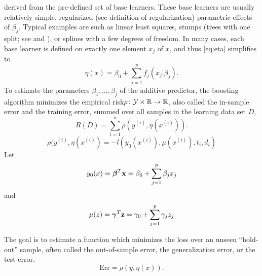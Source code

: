 derived from the pre-defined set of base learners.
These base learners are usually relatively simple, regularized (see definition of regularization) parametric effects of $\beta_j$. Typical examples are such as linear least squares, stumps (trees with one split; see \citet{buhlmann2007} and \citet{ESL}), or splines with a few degrees of freedom. In many cases, each base learner is defined on exactly one element $x_j$ of $x$, and thus \eqref{eq:eta} simplifies to
\begin{equation}\label{eq:eta-componentwise}
    \eta(x)=\beta_0+\sum_{j=1}^pf_j(x_j|\beta_j).
\end{equation}
To estimate the parameters $\beta_1,\ldots,\beta_j$ of the additive predictor, the boosting algorithm minimizes the empirical risk$\rho\colon\mathcal{Y}\times\mathbb{R}\to\mathbb{R}$, also called the in-sample error and the training error, summed over all samples in the learning data set $D$,
\begin{equation}\label{eq:empirical-risk}
    R(D)=\sum_{i=1}^n\rho(y^{(i)},\eta(x^{(i)})).
\end{equation}
\begin{equation}
    \rho(y^{(i)},\eta(x^{(i)})=-l(y_0(x^{(i)}), \mu(x^{(i)}), t_i, d_i)
\end{equation}
Let
\begin{equation}
    y_0(x)=\boldsymbol{\beta}^T\mathbf{x}=\beta_0+\sum_{j=1}^p \beta_jx_j
\end{equation}
and
\begin{equation}
    \mu(z)=\boldsymbol{\gamma}^T\mathbf{z}=\gamma_0+\sum_{j=1}^p \gamma_jz_j
\end{equation}

The goal is to estimate a function which minimizes the loss over an unseen ``hold-out'' sample, often called the out-of-sample error, the generalization error, or the test error.
\begin{equation}
    \text{Err}=\rho(y,\eta(x)).
\end{equation}

